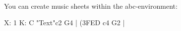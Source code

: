 \documentclass[a4paper,12pt]{article}
\begin{document}
	You can create music sheets within the abc-environment:
	\begin{abc}[name=c-dur]
		X: 1 %
		K: C %
		"Text"c2 G4 | (3FED c4 G2 |
	\end{abc}
\end{document}

